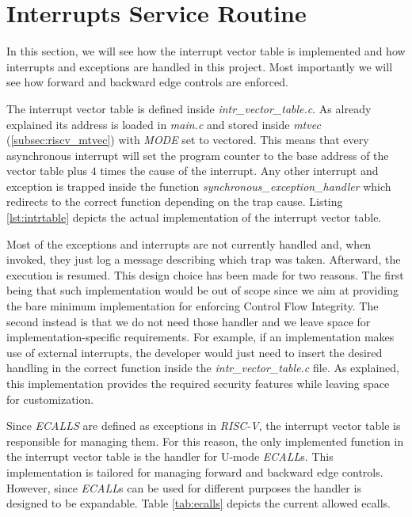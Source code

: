 \section{Interrupts Service Routine}
\label{sec:project_isr}

In this section, we will see how the interrupt vector table is implemented and
how interrupts and exceptions are handled in this project. Most importantly we will
see how forward and backward edge controls are enforced.

The interrupt vector table is defined inside \textit{intr\_vector\_table.c}. As already
explained its address is loaded in \textit{main.c} and stored inside \textit{mtvec}
(\ref{subsec:riscv_mtvec}) with \textit{MODE} set to vectored. This means that every
asynchronous interrupt will set the program counter to the base address of the vector
table plus $4$ times the cause of the interrupt. Any other interrupt and
exception is trapped inside the function \textit{synchronous\_exception\_handler}
which redirects to the correct function depending on the trap cause. Listing
\ref{lst:intrtable} depicts the actual implementation of the interrupt vector
table.

Most of the exceptions and interrupts are not currently handled and, when invoked,
they just log a message describing which trap was taken. Afterward, the
execution is resumed. This design choice has been made for two reasons. The
first being that such implementation would be out of scope since we aim at
providing the bare minimum implementation for enforcing Control Flow Integrity. The
second instead is that we do not need those handler and we leave space for implementation-specific
requirements. For example, if an implementation makes use of external interrupts,
the developer would just need to insert the desired handling in the correct
function inside the \textit{intr\_vector\_table.c} file. As explained, this implementation
provides the required security features while leaving space for customization.

Since \textit{ECALLS} are defined as exceptions in \textit{RISC-V}, the
interrupt vector table is responsible for managing them. For this reason, the
only implemented function in the interrupt vector table is the handler for U-mode
\textit{ECALL}s. This implementation is tailored for managing forward and backward
edge controls. However, since \textit{ECALL}s can be used for different purposes
the handler is designed to be expandable. Table \ref{tab:ecalls} depicts the
current allowed ecalls.

